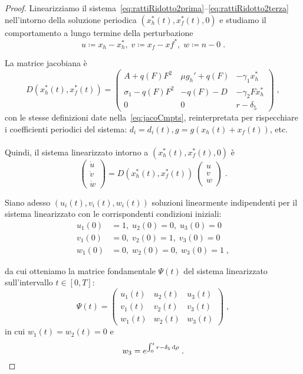\begin{proof}
Linearizziamo il sistema~\eqref{eq:rattiRidotto2prima}--\eqref{eq:rattiRidotto2terza}
nell'intorno della soluzione periodica $\left( x_h^*(t), x_f^*(t), 0 \right)$ e studiamo
il comportamento a lungo termine della perturbazione
$$u \coloneq x_h - x_h^* , \; v \coloneq x_f -xf^* , \; w \coloneq n -0 \; .$$

La matrice jacobiana è
$$D \left( x_h^*(t), x_f^*(t) \right) =
\begin{pmatrix}
A + q(F) F^2 & \mu g_h' + q(F) & - \gamma_1 x_h^* \\
\sigma_1 -q(F) F^2 & -q(F) -D & - \gamma_2 F x_h^* \\
0 & 0 & r -\delta_5
\end{pmatrix}
\; ,
$$
con le stesse definizioni date nella~\eqref{eq:jacoCmpts}, reinterpretata per rispecchiare i coefficienti
periodici del sistema: $d_i = d_i(t), g=g \left( x_h(t) + x_f(t) \right)$, etc.

\paragraph{}
Quindi, il sistema linearizzato intorno a $\left( x_h^*(t), x_f^*(t), 0 \right)$ è
$$
\begin{pmatrix}
\dot{u} \\
\dot{v} \\
\dot{w}
\end{pmatrix}
=
D \left( x_h^*(t), x_f^*(t) \right)
\;
\begin{pmatrix}
u \\
v \\
w
\end{pmatrix}
\; .
$$

Siano adesso
$\left( u_i(t), v_i(t), w_i(t) \right)$ soluzioni linearmente indipendenti per il sistema linearizzato
con le corrispondenti condizioni iniziali:
\begin{equation*}
    \begin{split}
        u_1(0)&=1 , \; u_2(0)=0 , \; u_3(0)=0 \\
        v_1(0)&=0 , \; v_2(0)=1 , \; v_3(0)=0 \\
        w_1(0)&=0 , \; w_2(0)=0 , \; w_3(0)=1 \; ,
    \end{split}
\end{equation*}

da cui otteniamo la matrice fondamentale $\Psi (t)$ del sistema linearizzato sull'intervallo $t \in [0, T]$:
$$ \Psi (t) =
\begin{pmatrix}
u_1(t) & u_2(t) & u_3(t) \\
v_1(t) & v_2(t) & v_3(t) \\
w_1(t) & w_2(t) & w_3(t)
\end{pmatrix}
\; ,
$$
in cui $w_1(t) = w_2(t) = 0$ e
$$w_3= e^{ \int_0^t r - \delta_5 \mathop{}\!\mathrm{d} \rho} \; .$$


\end{proof}
